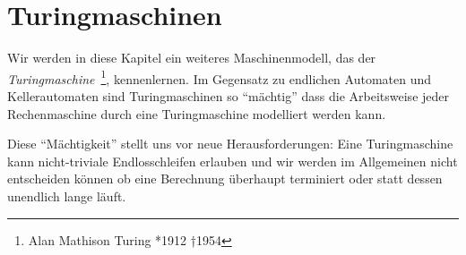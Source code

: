 \section{Turingmaschinen}
\newcommand{\M}{\mathcal{M}}
\newcommand{\godel}[1]{\ulcorner #1 \urcorner}
\newcommand{\D}{\mathcal{D}}
\newcommand{\mblank}{\text{\blank}}
\newcommand{\tmach}{\ensuremath{\mathbb{M}}}


Wir werden in diese Kapitel ein weiteres Maschinenmodell, das der \emph{Turingmaschine}~\footnote{Alan Mathison Turing *1912 †1954}, kennenlernen.
Im Gegensatz zu endlichen Automaten und Kellerautomaten
sind Turingmaschinen so ``mächtig''
dass die Arbeitsweise jeder Rechenmaschine durch eine Turingmaschine modelliert werden kann.

Diese ``Mächtigkeit'' stellt uns vor neue Herausforderungen:
Eine Turingmaschine kann nicht-triviale Endlosschleifen erlauben und wir werden im Allgemeinen 
nicht entscheiden können ob eine Berechnung überhaupt terminiert oder statt dessen unendlich lange läuft.

